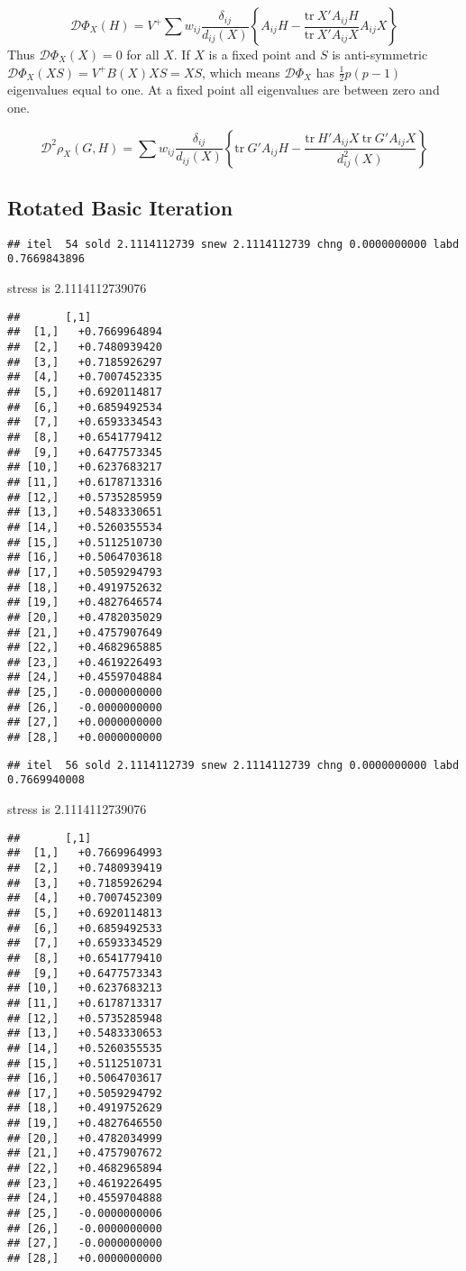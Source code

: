 \documentclass[
  12pt,
]{article}
\begin{document}
\[
\mathcal{D}\Phi_X(H)=V^+\sum w_{ij}\frac{\delta_{ij}}{d_{ij}(X)}\left\{A_{ij}H-\frac{\text{tr}\ X'A_{ij}H}{ \text{tr}\ X'A_{ij}X}A_{ij}X\right\}
\]
Thus \(\mathcal{D}\Phi_X(X)=0\) for all \(X\). If \(X\) is a fixed point and \(S\) is anti-symmetric \(\mathcal{D}\Phi_X(XS)=V^+B(X)XS=XS\),
which means \(\mathcal{D}\Phi_X\) has \(\frac12p(p-1)\) eigenvalues equal to one.
At a fixed point all eigenvalues are between zero and one.

\[
\mathcal{D}^2\rho_X(G,H)=\sum w_{ij}\frac{\delta_{ij}}{d_{ij}(X)}\left\{\text{tr}\ G'A_{ij}H-\frac{\text{tr}\ H'A_{ij}X\ \text{tr}\ G'A_{ij}X}{ d_{ij}^2(X)}\right\}
\]

\subsection{Rotated Basic Iteration}\label{rotated-basic-iteration}

\begin{verbatim}
## itel  54 sold 2.1114112739 snew 2.1114112739 chng 0.0000000000 labd 0.7669843896
\end{verbatim}

stress is 2.1114112739076

\begin{verbatim}
##       [,1]           
##  [1,]   +0.7669964894
##  [2,]   +0.7480939420
##  [3,]   +0.7185926297
##  [4,]   +0.7007452335
##  [5,]   +0.6920114817
##  [6,]   +0.6859492534
##  [7,]   +0.6593334543
##  [8,]   +0.6541779412
##  [9,]   +0.6477573345
## [10,]   +0.6237683217
## [11,]   +0.6178713316
## [12,]   +0.5735285959
## [13,]   +0.5483330651
## [14,]   +0.5260355534
## [15,]   +0.5112510730
## [16,]   +0.5064703618
## [17,]   +0.5059294793
## [18,]   +0.4919752632
## [19,]   +0.4827646574
## [20,]   +0.4782035029
## [21,]   +0.4757907649
## [22,]   +0.4682965885
## [23,]   +0.4619226493
## [24,]   +0.4559704884
## [25,]   -0.0000000000
## [26,]   -0.0000000000
## [27,]   +0.0000000000
## [28,]   +0.0000000000
\end{verbatim}

\begin{verbatim}
## itel  56 sold 2.1114112739 snew 2.1114112739 chng 0.0000000000 labd 0.7669940008
\end{verbatim}

stress is 2.1114112739076

\begin{verbatim}
##       [,1]           
##  [1,]   +0.7669964993
##  [2,]   +0.7480939419
##  [3,]   +0.7185926294
##  [4,]   +0.7007452309
##  [5,]   +0.6920114813
##  [6,]   +0.6859492533
##  [7,]   +0.6593334529
##  [8,]   +0.6541779410
##  [9,]   +0.6477573343
## [10,]   +0.6237683213
## [11,]   +0.6178713317
## [12,]   +0.5735285948
## [13,]   +0.5483330653
## [14,]   +0.5260355535
## [15,]   +0.5112510731
## [16,]   +0.5064703617
## [17,]   +0.5059294792
## [18,]   +0.4919752629
## [19,]   +0.4827646550
## [20,]   +0.4782034999
## [21,]   +0.4757907672
## [22,]   +0.4682965894
## [23,]   +0.4619226495
## [24,]   +0.4559704888
## [25,]   -0.0000000006
## [26,]   -0.0000000000
## [27,]   -0.0000000000
## [28,]   +0.0000000000
\end{verbatim}
\end{document}
